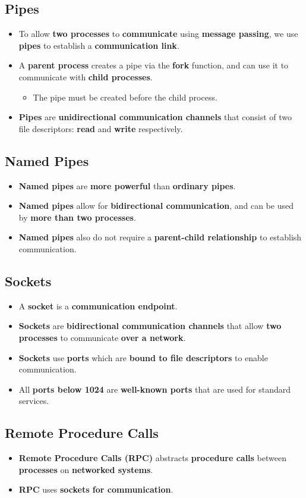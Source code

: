 \documentclass{article}
\begin{document}
    \subsection*{Pipes}
    \begin{itemize}
        \item To allow \textbf{two processes} to \textbf{communicate} using \textbf{message passing}, we use \textbf{pipes} to establish a \textbf{communication link}.
        \item A \textbf{parent process} creates a pipe via the \textbf{fork} function, and can use it to communicate with \textbf{child processes}. 
        \begin{itemize}
            \item The pipe must be created before the child process.
        \end{itemize}
        \item \textbf{Pipes} are \textbf{unidirectional communication channels}  that consist of two file descriptors: \textbf{read} and \textbf{write} respectively. 
    \end{itemize}

    \subsection*{Named Pipes}
    \begin{itemize}
        \item \textbf{Named pipes} are \textbf{more powerful} than \textbf{ordinary pipes}.
        \item \textbf{Named pipes} allow for \textbf{bidirectional communication}, and can be used by \textbf{more than two processes}.
        \item \textbf{Named pipes} also do not require a \textbf{parent-child relationship} to establish communication.
    \end{itemize}

    \subsection*{Sockets}
    \begin{itemize}
        \item A \textbf{socket} is a \textbf{communication endpoint}.
        \item \textbf{Sockets} are \textbf{bidirectional communication channels} that allow \textbf{two processes} to communicate \textbf{over a network}.
        \item \textbf{Sockets} use \textbf{ports} which are \textbf{bound to file descriptors} to enable communication.
        \item All \textbf{ports below 1024} are \textbf{well-known ports} that are used for standard services.
    \end{itemize}

    \subsection*{Remote Procedure Calls}
    \begin{itemize}
        \item \textbf{Remote Procedure Calls (RPC)} abstracts \textbf{procedure calls} between \textbf{processes} on \textbf{networked systems}.
        \item \textbf{RPC} uses \textbf{sockets for communication}.
    \end{itemize}
\end{document}
